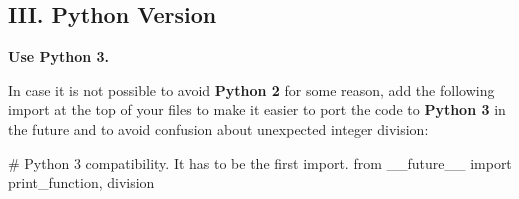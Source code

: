 \subsection*{I\+II. Python Version}

{\bfseries Use Python 3.}

In case it is not possible to avoid {\bfseries Python 2} for some reason, add the following import at the top of your files to make it easier to port the code to {\bfseries Python 3} in the future and to avoid confusion about unexpected integer division\+: \begin{DoxyVerb}# Python 3 compatibility. It has to be the first import.
from __future__ import print_function, division\end{DoxyVerb}
 